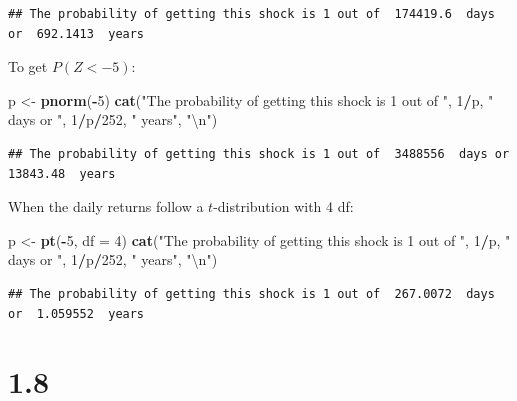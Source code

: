 \documentclass[11pt,]{article}
\newenvironment{Shaded}{\begin{snugshade}}{\end{snugshade}}
\newcommand{\CharTok}[1]{\textcolor[rgb]{0.31,0.60,0.02}{#1}}
\newcommand{\DataTypeTok}[1]{\textcolor[rgb]{0.13,0.29,0.53}{#1}}
\newcommand{\DecValTok}[1]{\textcolor[rgb]{0.00,0.00,0.81}{#1}}
\newcommand{\KeywordTok}[1]{\textcolor[rgb]{0.13,0.29,0.53}{\textbf{#1}}}
\newcommand{\NormalTok}[1]{#1}
\newcommand{\OperatorTok}[1]{\textcolor[rgb]{0.81,0.36,0.00}{\textbf{#1}}}
\newcommand{\StringTok}[1]{\textcolor[rgb]{0.31,0.60,0.02}{#1}}
\begin{document}
\begin{verbatim}
## The probability of getting this shock is 1 out of  174419.6  days or  692.1413  years
\end{verbatim}

To get \(P(Z < -5)\):

\begin{Shaded}
\begin{Highlighting}[]
\NormalTok{p <-}\StringTok{ }\KeywordTok{pnorm}\NormalTok{(}\OperatorTok{-}\DecValTok{5}\NormalTok{) }
\KeywordTok{cat}\NormalTok{(}\StringTok{"The probability of getting this shock is 1 out of "}\NormalTok{, }
    \DecValTok{1}\OperatorTok{/}\NormalTok{p, }\StringTok{" days or "}\NormalTok{, }\DecValTok{1}\OperatorTok{/}\NormalTok{p}\OperatorTok{/}\DecValTok{252}\NormalTok{, }\StringTok{" years"}\NormalTok{, }\StringTok{"}\CharTok{\textbackslash{}n}\StringTok{"}\NormalTok{)}
\end{Highlighting}
\end{Shaded}

\begin{verbatim}
## The probability of getting this shock is 1 out of  3488556  days or  13843.48  years
\end{verbatim}

When the daily returns follow a \(t\)-distribution with 4 df:

\begin{Shaded}
\begin{Highlighting}[]
\NormalTok{p <-}\StringTok{ }\KeywordTok{pt}\NormalTok{(}\OperatorTok{-}\DecValTok{5}\NormalTok{, }\DataTypeTok{df =} \DecValTok{4}\NormalTok{) }
\KeywordTok{cat}\NormalTok{(}\StringTok{"The probability of getting this shock is 1 out of "}\NormalTok{, }
    \DecValTok{1}\OperatorTok{/}\NormalTok{p, }\StringTok{" days or "}\NormalTok{, }\DecValTok{1}\OperatorTok{/}\NormalTok{p}\OperatorTok{/}\DecValTok{252}\NormalTok{, }\StringTok{" years"}\NormalTok{, }\StringTok{"}\CharTok{\textbackslash{}n}\StringTok{"}\NormalTok{)}
\end{Highlighting}
\end{Shaded}

\begin{verbatim}
## The probability of getting this shock is 1 out of  267.0072  days or  1.059552  years
\end{verbatim}

\hypertarget{section-2}{%
\section{1.8}\label{section-2}}
\end{document}
